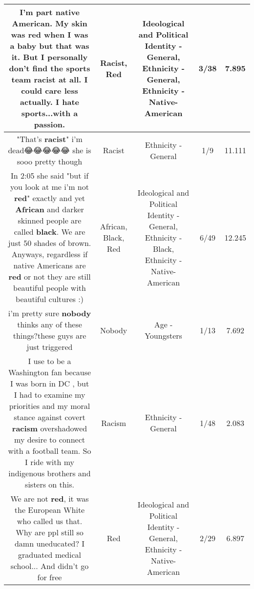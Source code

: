 \documentclass[11pt]{article}
\newlength\mylength
\begin{document}
\begin{center}
\begin{longtable}{|C{.65\mylength}|C{.30\mylength}|C{.12\mylength}|C{.12\mylength}|C{.12\mylength}|}
  \small I'm part native American. My skin was \textbf{r\textbf{ed}} when I was a baby but that was it. But I personally don't find the sports team \textbf{racist} at all. I could care less actually. I hate sports...with a passion.\normalsize   & Racist, Red &  Ideological and Political Identity - General, Ethnicity - General, Ethnicity - Native-American & 3/38 & 7.895 \\  \hline
  \small "That's \textbf{racist}" i'm dead😂😂😂😂😂 she is sooo pretty though\normalsize   & Racist & Ethnicity - General & 1/9 & 11.111 \\  \hline
  \small In 2:05 she said "but if you look at me i'm not \textbf{r\textbf{ed}}"  exactly and yet \textbf{African} and darker skinned people are called \textbf{black}. We are just 50 shades of brown. Anyways, regardless if native Americans are \textbf{r\textbf{ed}} or not they are still beautiful people with beautiful cultures :)\normalsize   & African, Black, Red &  Ideological and Political Identity - General, Ethnicity - Black, Ethnicity - Native-American & 6/49 & 12.245 \\  \hline
  \small i'm pretty sure  \textbf{nobody} thinks any of these things?these guys are just triggered\normalsize   & Nobody & Age - Youngsters & 1/13 & 7.692 \\  \hline
  \small I use to be a Washington fan because I was born in DC , but I had to examine my priorities and my moral stance against covert \textbf{racism} overshadowed my desire to connect with a football team. So I ride with my indigenous brothers and sisters on this.\normalsize   & Racism & Ethnicity - General & 1/48 & 2.083 \\  \hline
  \small We are not \textbf{r\textbf{ed}},   it was the European White who called us that.   Why are ppl still so damn uneducated?   I graduated medical school... And didn't go for free\normalsize   & Red &  Ideological and Political Identity - General, Ethnicity - Native-American & 2/29 & 6.897 \\  \hline

\end{longtable}
\end{center}
\end{document}
